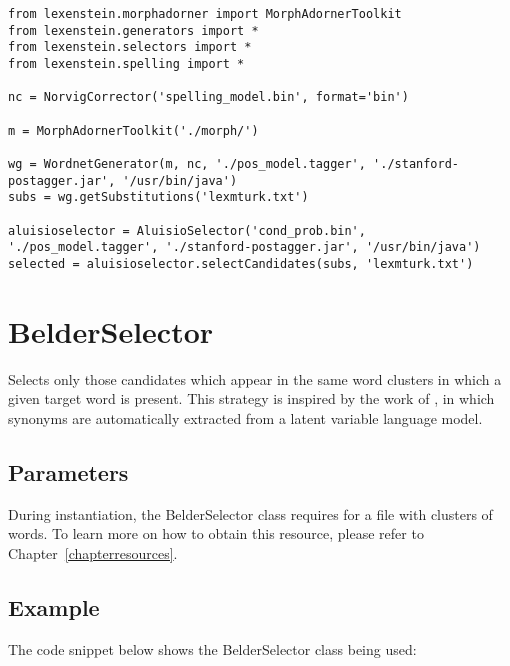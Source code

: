 \begin{lstlisting}
from lexenstein.morphadorner import MorphAdornerToolkit
from lexenstein.generators import *
from lexenstein.selectors import *
from lexenstein.spelling import *

nc = NorvigCorrector('spelling_model.bin', format='bin')

m = MorphAdornerToolkit('./morph/')

wg = WordnetGenerator(m, nc, './pos_model.tagger', './stanford-postagger.jar', '/usr/bin/java')
subs = wg.getSubstitutions('lexmturk.txt')

aluisioselector = AluisioSelector('cond_prob.bin', './pos_model.tagger', './stanford-postagger.jar', '/usr/bin/java')
selected = aluisioselector.selectCandidates(subs, 'lexmturk.txt')
\end{lstlisting}














\section{BelderSelector}

Selects only those candidates which appear in the same word clusters in which a given target word is present. This strategy is inspired by the work of \cite{Belder2010}, in which synonyms are automatically extracted from a latent variable language model.

\subsection{Parameters}

During instantiation, the BelderSelector class requires for a file with clusters of words. To learn more on how to obtain this resource, please refer to Chapter~\ref{chapterresources}.

\subsection{Example}

The code snippet below shows the BelderSelector class being used:

